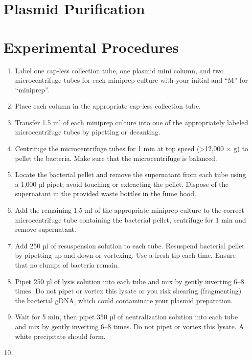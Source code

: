 \documentclass[]{book}
\providecommand{\tightlist}{%
  \setlength{\itemsep}{0pt}\setlength{\parskip}{0pt}}
\theoremstyle{definition}
\theoremstyle{definition}
\theoremstyle{definition}
\theoremstyle{remark}
\begin{document}
\section{Plasmid Purification}\label{plasmid-purification}

\section{Experimental Procedures}\label{experimental-procedures-15}

\begin{enumerate}
\def\labelenumi{\arabic{enumi}.}
\tightlist
\item
  Label one cap-less collection tube, one plasmid mini column, and two
  microcentrifuge tubes for each miniprep culture with your initial and
  ``M'' for ``miniprep''.
\item
  Place each column in the appropriate cap-less collection tube.
\item
  Transfer 1.5 ml of each miniprep culture into one of the appropriately
  labeled microcentrifuge tubes by pipetting or decanting.
\item
  Centrifuge the microcentrifuge tubes for 1 min at top speed
  (\textgreater{}12,000 × g) to pellet the bacteria. Make sure that the
  microcentrifuge is balanced.
\item
  Locate the bacterial pellet and remove the supernatant from each tube
  using a 1,000 µl pipet; avoid touching or extracting the pellet.
  Dispose of the supernatant in the provided waste bottles in the fume
  hood.
\item
  Add the remaining 1.5 ml of the appropriate miniprep culture to the
  correct microcentrifuge tube containing the bacterial pellet,
  centrifuge for 1 min and remove supernatant.
\item
  Add 250 µl of resuspension solution to each tube. Resuspend bacterial
  pellet by pipetting up and down or vortexing. Use a fresh tip each
  time. Ensure that no clumps of bacteria remain.
\item
  Pipet 250 µl of lysis solution into each tube and mix by gently
  inverting 6--8 times. Do not pipet or vortex this lysate or you risk
  shearing (fragmenting) the bacterial gDNA, which could contaminate
  your plasmid preparation.
\item
  Wait for 5 min, then pipet 350 µl of neutralization solution into each
  tube and mix by gently inverting 6--8 times. Do not pipet or vortex
  this lysate. A white precipitate should form.
\item

\end{enumerate}
\end{document}
